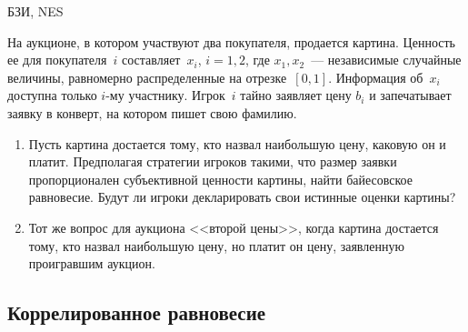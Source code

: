 \begin{problem}
\begin{source}
БЗИ, NES
\end{source} На аукционе, в
котором участвуют два покупателя, продается картина.
Ценность ее для покупателя~$i$ составляет~$x_i$, $i=1,2$,
где $x_1,x_2$~--- независимые случайные величины,
равномерно распределенные на отрезке~$[0,1]$. Информация
об~$x_i$ доступна только $i$-му участнику. Игрок~$i$ тайно
заявляет цену $b_i$ и запечатывает заявку в конверт, на
котором пишет свою фамилию.

\begin{enumerate}

\item Пусть картина достается тому, кто назвал наибольшую
цену, каковую он и платит. Предполагая стратегии игроков
такими, что размер заявки пропорционален субъективной
ценности картины, найти байесовское равновесие. Будут ли
игроки декларировать свои истинные оценки картины?

\item Тот же вопрос для аукциона <<второй цены>>, когда
картина достается тому, кто назвал наибольшую цену, но
платит он цену, заявленную проигравшим аукцион.

\end{enumerate}








\begin{sol}

\end{sol}
\end{problem}



\subsection{Коррелированное равновесие}



